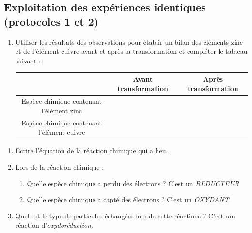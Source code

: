 \documentclass[a4paper,12pt,fleqn]{article}%
\begin{document}
    \subsection{Exploitation des expériences identiques (protocoles 1 et 2)}
    \begin{enumerate}[resume]
        \item Utiliser les résultats des observations pour établir un bilan des éléments zinc et de l'élément cuivre avant et après la transformation et compléter le tableau suivant :\\
        \begin{tabular}{|c|c|c|}
            \hline
            &Avant transformation & Après transformation\\
            \hline
            Espèce chimique contenant l'élément zinc & & \\
            \hline
            Espèce chimique contenant l'élément cuivre & & \\
            \hline
        \end{tabular}
    \end{enumerate}
    
    \begin{enumerate}[resume]
        \item Ecrire l'équation de la réaction chimique qui a lieu.
        \item Lors de la réaction chimique :
        \begin{enumerate}
            \item Quelle espèce chimique a perdu des électrons ? C'est un \emph{REDUCTEUR}
            \item Quelle espèce chimique a capté des électrons ? C'est un \emph{OXYDANT}
        \end{enumerate}
        \item Quel est le type de particules échangées lors de cette réactions ? C'est une réaction d'\emph{oxydoréduction}.
    \end{enumerate}
\end{document}
